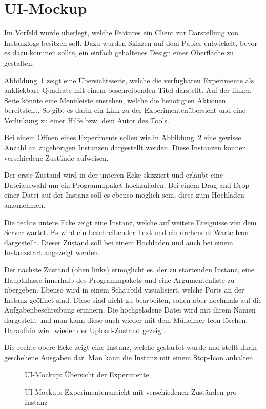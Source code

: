 \section{UI-Mockup}
Im Vorfeld wurde überlegt, welche Features ein Client zur Darstellung von Instanzlogs besitzen soll.
Dazu wurden Skizzen auf dem Papier entwickelt, bevor es dazu kommen sollte, ein einfach gehaltenes Design einer Oberfläche zu gestalten.
\par
Abbildung~\ref{fig:ui-mockup-1} zeigt eine Übersichtsseite, welche die verfügbaren Experimente als anklickbare Quadrate mit einem beschreibenden Titel darstellt.
Auf der linken Seite könnte eine Menüleiste enstehen, welche die benötigten Aktionen bereitstellt.
So gibt es darin ein Link zu der Experimentenübersicht und eine Verlinkung zu einer Hilfe bzw. dem Autor des Tools.
\par
Bei einem Öffnen eines Experiments sollen wie in Abbildung~\ref{fig:ui-mockup-2} eine gewisse Anzahl an zugehörigen Instanzen dargestellt werden.
Diese Instanzen können verschiedene Zustände aufweisen.
\par
Der erste Zustand wird in der unteren Ecke skizziert und erlaubt eine Dateiauswahl um ein Programmpaket hochzuladen.
Bei einem Drag-and-Drop einer Datei auf der Instanz soll es ebenso möglich sein, diese zum Hochladen anzunehmen.
\par
Die rechte untere Ecke zeigt eine Instanz, welche auf weitere Ereignisse von dem Server wartet.
Es wird ein beschreibender Text und ein drehendes Warte-Icon dargestellt.
Dieser Zustand soll bei einem Hochladen und auch bei einem Instanzstart angezeigt werden.
\par
Der nächste Zustand (oben links) ermöglicht es, der zu startenden Instanz, eine Hauptklasse innerhalb des Programmpakets und eine Argumentenliste zu übergeben.
Ebenso wird in einem Schaubild visualisiert, welche Ports an der Instanz geöffnet sind.
Diese sind nicht zu bearbeiten, sollen aber nochmals auf die Aufgabenbeschreibung erinnern.
Die hochgeladene Datei wird mit ihrem Namen dargestellt und man kann diese auch wieder mit dem Mülleimer-Icon löschen.
Daraufhin wird wieder der Upload-Zustand gezeigt.
\par
Die rechte obere Ecke zeigt eine Instanz, welche gestartet wurde und stellt darin geschehene Ausgaben dar.
Man kann die Instanz mit einem Stop-Icon anhalten.
\begin{landscape}
  \begin{figure}[h]
    \centering
    \par
    \caption{UI-Mockup: Übersicht der Experimente}
    \label{fig:ui-mockup-1}
  \end{figure}
  \begin{figure}[h]
    \centering
    \par
    \caption{UI-Mockup: Experimentenansicht mit verschiedenen Zuständen pro Instanz}
    \label{fig:ui-mockup-2}
  \end{figure}
\end{landscape}

